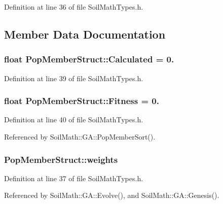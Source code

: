 Definition at line 36 of file Soil\+Math\+Types.\+h.



\subsection{Member Data Documentation}
\hypertarget{struct_pop_member_struct_a8e76eeb476bc89f765b1d872d399fe0c}{}
\subsubsection[{Calculated}]{\setlength{\rightskip}{0pt plus 5cm}float Pop\+Member\+Struct\+::\+Calculated = 0.}\label{struct_pop_member_struct_a8e76eeb476bc89f765b1d872d399fe0c}


Definition at line 39 of file Soil\+Math\+Types.\+h.

\hypertarget{struct_pop_member_struct_a750ec8010731e3e2a876051475c31b14}{}
\subsubsection[{Fitness}]{\setlength{\rightskip}{0pt plus 5cm}float Pop\+Member\+Struct\+::\+Fitness = 0.}\label{struct_pop_member_struct_a750ec8010731e3e2a876051475c31b14}


Definition at line 40 of file Soil\+Math\+Types.\+h.



Referenced by Soil\+Math\+::\+G\+A\+::\+Pop\+Member\+Sort().

\hypertarget{struct_pop_member_struct_aeba960170ef60a906c730cc24cd90367}{}
\subsubsection[{weights}]{ Pop\+Member\+Struct\+::weights}\label{struct_pop_member_struct_aeba960170ef60a906c730cc24cd90367}


Definition at line 37 of file Soil\+Math\+Types.\+h.



Referenced by Soil\+Math\+::\+G\+A\+::\+Evolve(), and Soil\+Math\+::\+G\+A\+::\+Genesis().

